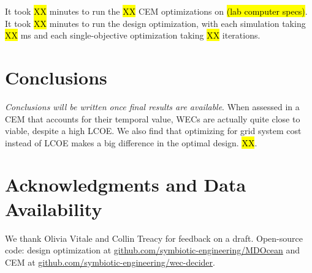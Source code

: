 \documentclass[10pt,twoside]{article}
\newif\ifplaceholder
\begin{document}
It took \hl{XX} minutes to run the \hl{XX} CEM optimizations on \hl{(lab computer specs)}.
It took \hl{XX} minutes to run the design optimization, with each simulation taking \hl{XX} ms and each single-objective optimization taking \hl{XX} iterations.


\section{Conclusions}
\textit{Conclusions will be written once final results are available}.
When assessed in a CEM that accounts for their temporal value, WECs are actually quite close to viable, despite a high LCOE.
We also find that optimizing for grid system cost instead of LCOE makes a big difference in the optimal design.
\hl{XX}. 

\section*{Acknowledgments and Data Availability}
We thank Olivia Vitale and Collin Treacy for feedback on a draft. Open-source code: design optimization at \url{github.com/symbiotic-engineering/MDOcean} and CEM at \url{github.com/symbiotic-engineering/wec-decider}.

\clearpage

\end{document}
